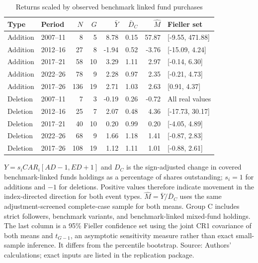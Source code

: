 \begin{table}[!htbp]
\centering
\caption{Returns scaled by observed benchmark linked fund purchases}\label{tab:demand}
\small
\setlength{\tabcolsep}{5pt}
\begin{tabular}{llrrrrrl}
\toprule
Type & Period & $N$ & $G$ & $\bar Y$ & $\bar D_C$ & $\widehat M$ & Fieller set \\
\midrule
Addition & 2007--11 & 8 & 5 & 8.78 & 0.15 & 57.87 & [-9.55, 471.88] \\
Addition & 2012--16 & 27 & 8 & -1.94 & 0.52 & -3.76 & [-15.09, 4.24] \\
Addition & 2017--21 & 58 & 10 & 3.29 & 1.11 & 2.97 & [-0.14, 6.30] \\
Addition & 2022--26 & 78 & 9 & 2.28 & 0.97 & 2.35 & [-0.21, 4.73] \\
Addition & 2017--26 & 136 & 19 & 2.71 & 1.03 & 2.63 & [0.91, 4.37] \\
Deletion & 2007--11 & 7 & 3 & -0.19 & 0.26 & -0.72 & All real values \\
Deletion & 2012--16 & 25 & 7 & 2.07 & 0.48 & 4.36 & [-17.73, 30.17] \\
Deletion & 2017--21 & 40 & 10 & 0.20 & 0.99 & 0.20 & [-4.05, 4.89] \\
Deletion & 2022--26 & 68 & 9 & 1.66 & 1.18 & 1.41 & [-0.87, 2.83] \\
Deletion & 2017--26 & 108 & 19 & 1.12 & 1.11 & 1.01 & [-0.88, 2.61] \\
\bottomrule
\end{tabular}
\begin{minipage}{\linewidth}\footnotesize\vspace{5pt}
$Y=s_i CAR_i[AD-1,ED+1]$ and $D_C$ is the sign-adjusted change in covered benchmark-linked funds\textquotesingle{} holdings as a percentage of shares outstanding; $s_i=1$ for additions and $-1$ for deletions. Positive values therefore indicate movement in the index-directed direction for both event types. $\widehat M=\bar Y/\bar D_C$ uses the same adjustment-screened complete-case sample for both means. Group C includes strict followers, benchmark variants, and benchmark-linked mixed-fund holdings. The last column is a 95\% Fieller confidence set using the joint CR1 covariance of both means and $t_{G-1}$, an asymptotic sensitivity measure rather than exact small-sample inference. It differs from the percentile bootstrap. Source: Authors' calculations; exact inputs are listed in the replication package.
\end{minipage}
\end{table}
